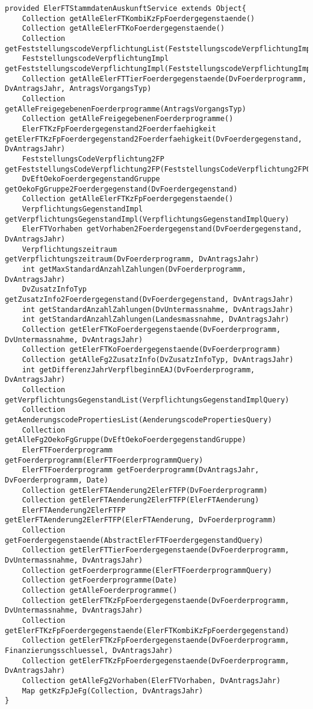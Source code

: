 \begin{lstlisting}[style = dsl, caption = Deklartion von ElerFTStammdatenAuskunftService, captionpos = b, label = lst_eftstd]
provided ElerFTStammdatenAuskunftService extends Object{
	Collection getAlleElerFTKombiKzFpFoerdergegenstaende()
	Collection getAlleElerFTKoFoerdergegenstaende()
	Collection getFeststellungscodeVerpflichtungList(FeststellungscodeVerpflichtungImplQuery)
	FeststellungscodeVerpflichtungImpl getFeststellungscodeVerpflichtungImpl(FeststellungscodeVerpflichtungImplQuery)
	Collection getAlleElerFTTierFoerdergegenstaende(DvFoerderprogramm, DvAntragsJahr, AntragsVorgangsTyp)
	Collection getAlleFreigegebenenFoerderprogramme(AntragsVorgangsTyp)
	Collection getAlleFreigegebenenFoerderprogramme()
	ElerFTKzFpFoerdergegenstand2Foerderfaehigkeit getElerFTKzFpFoerdergegenstand2Foerderfaehigkeit(DvFoerdergegenstand, DvAntragsJahr)
	FeststellungsCodeVerpflichtung2FP getFeststellungsCodeVerpflichtung2FP(FeststellungsCodeVerpflichtung2FPQuery)
	DvEftOekoFoerdergegenstandGruppe getOekoFgGruppe2Foerdergegenstand(DvFoerdergegenstand)
	Collection getAlleElerFTKzFpFoerdergegenstaende()
	VerpflichtungsGegenstandImpl getVerpflichtungsGegenstandImpl(VerpflichtungsGegenstandImplQuery)
	ElerFTVorhaben getVorhaben2Foerdergegenstand(DvFoerdergegenstand, DvAntragsJahr)
	Verpflichtungszeitraum getVerpflichtungszeitraum(DvFoerderprogramm, DvAntragsJahr)
	int getMaxStandardAnzahlZahlungen(DvFoerderprogramm, DvAntragsJahr)
	DvZusatzInfoTyp getZusatzInfo2Foerdergegenstand(DvFoerdergegenstand, DvAntragsJahr)
	int getStandardAnzahlZahlungen(DvUntermassnahme, DvAntragsJahr)
	int getStandardAnzahlZahlungen(Landesmassnahme, DvAntragsJahr)
	Collection getElerFTKoFoerdergegenstaende(DvFoerderprogramm, DvUntermassnahme, DvAntragsJahr)
	Collection getElerFTKoFoerdergegenstaende(DvFoerderprogramm)
	Collection getAlleFg2ZusatzInfo(DvZusatzInfoTyp, DvAntragsJahr)
	int getDifferenzJahrVerpflbeginnEAJ(DvFoerderprogramm, DvAntragsJahr)
	Collection getVerpflichtungsGegenstandList(VerpflichtungsGegenstandImplQuery)
	Collection getAenderungscodePropertiesList(AenderungscodePropertiesQuery)
	Collection getAlleFg2OekoFgGruppe(DvEftOekoFoerdergegenstandGruppe)
	ElerFTFoerderprogramm getFoerderprogramm(ElerFTFoerderprogrammQuery)
	ElerFTFoerderprogramm getFoerderprogramm(DvAntragsJahr, DvFoerderprogramm, Date)
	Collection getElerFTAenderung2ElerFTFP(DvFoerderprogramm)
	Collection getElerFTAenderung2ElerFTFP(ElerFTAenderung)
	ElerFTAenderung2ElerFTFP getElerFTAenderung2ElerFTFP(ElerFTAenderung, DvFoerderprogramm)
	Collection getFoerdergegenstaende(AbstractElerFTFoerdergegenstandQuery)
	Collection getElerFTTierFoerdergegenstaende(DvFoerderprogramm, DvUntermassnahme, DvAntragsJahr)
	Collection getFoerderprogramme(ElerFTFoerderprogrammQuery)
	Collection getFoerderprogramme(Date)
	Collection getAlleFoerderprogramme()
	Collection getElerFTKzFpFoerdergegenstaende(DvFoerderprogramm, DvUntermassnahme, DvAntragsJahr)
	Collection getElerFTKzFpFoerdergegenstaende(ElerFTKombiKzFpFoerdergegenstand)
	Collection getElerFTKzFpFoerdergegenstaende(DvFoerderprogramm, Finanzierungsschluessel, DvAntragsJahr)
	Collection getElerFTKzFpFoerdergegenstaende(DvFoerderprogramm, DvAntragsJahr)
	Collection getAlleFg2Vorhaben(ElerFTVorhaben, DvAntragsJahr)
	Map getKzFpJeFg(Collection, DvAntragsJahr)
}
\end{lstlisting}
